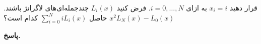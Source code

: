 قرار دهید
\(x_i=i\)
به ازای  
\(i=0, \ldots, N\).
فرض کنید 
\(L_i(x)\)
چندجمله‌ای‌های لاگرانژ باشند.
حاصل
\(\sum_{i=0}^{N} iL_i(x)\)
کدام است؟
\vspace*{-.3cm}
          {\(x^2\)}{\(L_N(x) - L_0(x)\)}

\begin{answer}

	\textbf{پاسخ.}
	
\end{answer}
